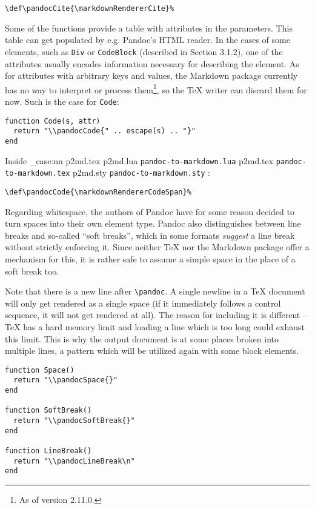 \documentclass[
  digital,     %
  oneside,     %
  nosansbold,  %
  nocolorbold, %
  lof,         %
  nolot,       %
]{fithesis4}
\newcommand\macro[1]{\texttt{\textbackslash{}{#1}}}
\newcommand\pandoc[1]{\macro{pandoc\-{#1}}}
\newcommand\file[1]
  {
    \str_case:nn
      { #1 }
      {
        { p2md.lua } { \texttt{pandoc\hyp{}to\hyp{}markdown.lua} }
        { p2md.tex } { \texttt{pandoc\hyp{}to\hyp{}markdown.tex} }
        { p2md.sty } { \texttt{pandoc\hyp{}to\hyp{}markdown.sty} }
      }
  }
\begin{document}
\noindent
\lstset{language=[plain]TeX}
\begin{lstlisting}
\def\pandocCite{\markdownRendererCite}%
\end{lstlisting}

\noindent
Some of the functions provide a table with attributes in the parameters. This table can get populated by e.g. Pandoc's HTML reader. In the cases of some elements, such as \texttt{Div} or \texttt{CodeBlock} (described in Section 3.1.2), one of the attributes usually encodes information necessary for describing the element. As for attributes with arbitrary keys and values, the Markdown package currently has no way to interpret or process them\footnote{As of version 2.11.0.}, so the \TeX{} writer can discard them for now. Such is the case for \texttt{Code}:

\noindent
\lstset{language=[5.3]Lua}
\begin{lstlisting}
function Code(s, attr)
  return "\\pandocCode{" .. escape(s) .. "}"
end
\end{lstlisting}

\noindent
Inside \file{p2md.tex}:

\noindent
\lstset{language=[plain]TeX}
\begin{lstlisting}
\def\pandocCode{\markdownRendererCodeSpan}%
\end{lstlisting}

\noindent
Regarding whitespace, the authors of Pandoc have for some reason decided to turn spaces into their own element type. Pandoc also distinguishes between line breaks and so-called ``soft breaks'', which in some formats \textit{suggest} a line break without strictly enforcing it. Since neither \TeX{} nor the Markdown package offer a mechanism for this, it is rather safe to assume a simple space in the place of a soft break too.

Note that there is a new line after \pandoc{LineBreak}. A single newline in a \TeX{} document will only get rendered as a single space (if it immediately follows a control sequence, it will not get rendered at all). The reason for including it is different -- \TeX{} has a hard memory limit and loading a line which is too long could exhaust this limit. This is why the output document is at some places broken into multiple lines, a pattern which will be utilized again with some block elements.

\noindent
\lstset{language=[5.3]Lua}
\begin{lstlisting}
function Space()
  return "\\pandocSpace{}"
end

function SoftBreak()
  return "\\pandocSoftBreak{}"
end

function LineBreak()
  return "\\pandocLineBreak\n"
end
\end{lstlisting}
\end{document}
